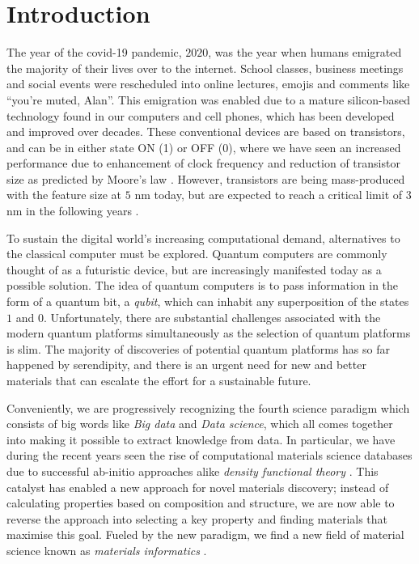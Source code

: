 \chapter{Introduction}

The year of the covid-19 pandemic, $2020$, was the year when humans emigrated the majority of their lives over to the internet. School classes, business meetings and social events were rescheduled into online lectures, emojis and comments like ``you're muted, Alan''. This emigration was enabled due to a mature silicon-based technology found in our computers and cell phones, which has been developed and improved over decades. These conventional devices are based on transistors, and can be in either state ON (1) or OFF (0), where we have seen an increased performance due to enhancement of clock frequency and reduction of transistor size as predicted by Moore's law \cite{Moore1965, Pavicic2006}. However, transistors are being mass-produced with the feature size at $5$ nm today, but are expected to reach a critical limit of $3$ nm in the following years \cite{Gwennap2020}.



To sustain the digital world's increasing computational demand, alternatives to the classical computer must be explored. Quantum computers are commonly thought of as a futuristic device, but are increasingly manifested today as a possible solution. The idea of quantum computers is to pass information in the form of a quantum bit, a \textit{qubit}, which can inhabit any superposition of the states $1$ and $0$. Unfortunately, there are substantial challenges associated with the modern quantum platforms simultaneously as the selection of quantum platforms is slim. The majority of discoveries of potential quantum platforms has so far happened by serendipity, and there is an urgent need for new and better materials that can escalate the effort for a sustainable future.

Conveniently, we are progressively recognizing the fourth science paradigm which consists of big words like \textit{Big data} and \textit{Data science}, which all comes together into making it possible to extract knowledge from data. In particular, we have during the recent years seen the rise of computational materials science databases \cite{Curtarolo2012, Curtarolo2012a, Calderon2015, Jain2013, Jain2016, Jain2018, Saal2013, Kirklin2015, Choudhary2020, Allen1987} due to successful ab-initio approaches alike \textit{density functional theory} \cite{Kohn1965}. This catalyst has enabled a new approach for novel materials discovery; instead of calculating properties based on composition and structure, we are now able to reverse the approach into selecting a key property and finding materials that maximise this goal.
Fueled by the new paradigm, we find a new field of material science known as \textit{materials informatics} \cite{Rajan2005}.

